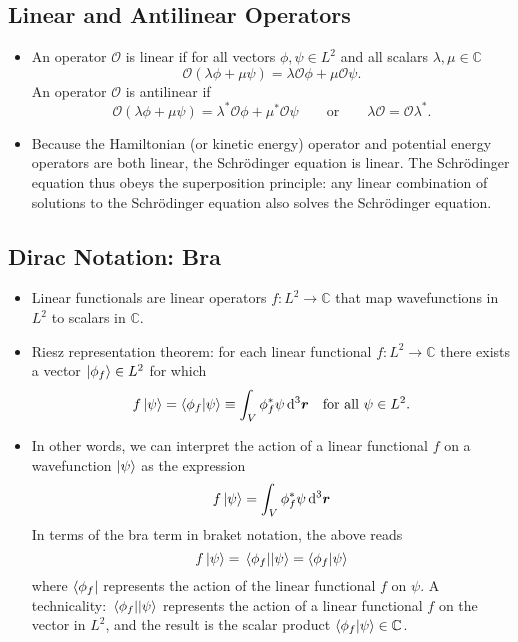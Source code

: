 \documentclass[11pt, a4paper]{article}
\newcommand{\diff}{\mathop{}\!\mathrm{d}} %
\newcommand{\dr}{\diff^{3} \r}  %
\newcommand{\eqtext}[1]{\qquad \text{#1} \qquad}
\newcommand{\Schro}{Schr\"{o}dinger\xspace}
\renewcommand{\vec}[1]{\bm{#1}}  %
\renewcommand{\r}{\vec{r}}  %
\renewcommand{\O}{\mathcal{O}}  %
\newcommand{\p}{\psi}  %
\begin{document}
\subsection{Linear and Antilinear Operators}
\begin{itemize}
	\item An operator $ \O $ is linear if for all vectors $ \phi, \psi \in L^{2} $ and all scalars $ \lambda, \mu \in \mathbb{C} $
	\begin{equation*}
		\O(\lambda \phi + \mu \p)  = \lambda \O \phi + \mu \O \p.
	\end{equation*}
	An operator $ \O $ is antilinear if
	\begin{equation*}
		\O(\lambda \phi + \mu \p)  = \lambda^{*} \O \phi + \mu^{*} \O \p \eqtext{or} \lambda \O = \O \lambda^{*}.
	\end{equation*}
	
	\item Because the Hamiltonian (or kinetic energy) operator and potential energy operators are both linear, the \Schro equation is linear. The \Schro equation thus obeys the superposition principle: any linear combination of solutions to the \Schro equation also solves the \Schro equation.
\end{itemize}

\subsection{Dirac Notation: Bra}
\begin{itemize}
	\item Linear functionals are linear operators $ f:L^{2} \to \mathbb{C} $ that map wavefunctions in $ L^{2} $ to scalars in $ \mathbb{C} $. 
	
	\item Riesz representation theorem: for each linear functional $ f:L^{2} \to \mathbb{C} $ there exists a vector $ \ket{\phi_{f}} \in L^{2} $ for which 
	\begin{equation*}
		f\ket{\psi} = \braket{\phi_{f}}{\psi} \equiv \int_{V} \phi_{f}^{*} \psi \dr  \quad \text{for all } \psi \in L^{2}.
	\end{equation*}
	
	\item In other words, we can interpret the action of a linear functional $ f $ on a wavefunction $ \ket{\psi} $ as the expression
	\begin{equation*}
		f\ket{\psi} =  \int_{V} \phi_{f}^{*} \psi \dr
	\end{equation*}
	In terms of the bra term in braket notation, the above reads
	\begin{equation*}
		f \ket{\psi} = \mel{\phi_{f}}{}{\psi} = \braket{\phi_{f}}{\psi}
	\end{equation*}
	where $ \bra{\phi_{f}} $ represents the action of the linear functional $ f $ on $ \psi $. A technicality:  $ \mel{\phi_{f}}{}{\psi}  $ represents the action of a linear functional $ f $ on the vector in $ L^{2} $, and the result is the scalar product $ \braket{\phi_{f}}{\psi} \in \mathbb{C} $. 
	
\end{itemize}
\end{document}
